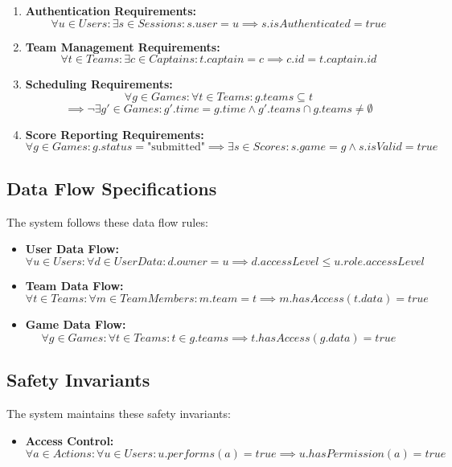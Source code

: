 \documentclass[12pt, titlepage]{article}
\begin{document}
\begin{enumerate}
    \item \textbf{Authentication Requirements:}
    \[ \forall u \in Users: \exists s \in Sessions: s.user = u \implies s.isAuthenticated = true \]
    
    \item \textbf{Team Management Requirements:}
    \[ \forall t \in Teams: \exists c \in Captains: t.captain = c \implies c.id = t.captain.id \]
    
    \item \textbf{Scheduling Requirements:}
    \[ \forall g \in Games: \forall t \in Teams: g.teams \subseteq t \]
    \[ \implies \neg \exists g' \in Games: g'.time = g.time \land g'.teams \cap g.teams \neq \emptyset \]
    
    \item \textbf{Score Reporting Requirements:}
    \[ \forall g \in Games: g.status = \text{"submitted"} \implies \exists s \in Scores: s.game = g \land s.isValid = true \]
\end{enumerate}

\subsection{Data Flow Specifications}
The system follows these data flow rules:

\begin{itemize}
    \item \textbf{User Data Flow:}
    \[ \forall u \in Users: \forall d \in UserData: d.owner = u \implies d.accessLevel \leq u.role.accessLevel \]
    
    \item \textbf{Team Data Flow:}
    \[ \forall t \in Teams: \forall m \in TeamMembers: m.team = t \implies m.hasAccess(t.data) = true \]
    
    \item \textbf{Game Data Flow:}
    \[ \forall g \in Games: \forall t \in Teams: t \in g.teams \implies t.hasAccess(g.data) = true \]
\end{itemize}

\subsection{Safety Invariants}
The system maintains these safety invariants:

\begin{itemize}
    \item \textbf{Access Control:}
    \[ \forall a \in Actions: \forall u \in Users: u.performs(a) = true \implies u.hasPermission(a) = true \]
\end{itemize}
\end{document}
